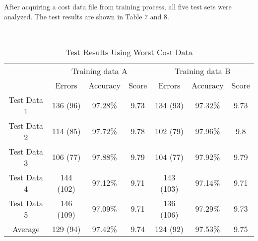 \documentclass[english]{nlp}
\begin{document}
After acquiring a cost data file from training process, all five test
sets were analyzed. The test results are shown in Table 7 and 8.

\begin{table}[ht]
\begin{center}
\caption{Test Results Using Worst Cost Data}
~\\\vspace{-2mm}
\label{table:test_resultsA}
\begin{tabular}{|c|c|c|c|c|c|c|}
\cline{2-7}
\multicolumn{1}{c}{~} & \multicolumn{3}{|c|}{Training data A} & \multicolumn{3}{|c|}{Training data B} \\
\cline{2-7}
\cline{2-7}
\multicolumn{1}{c|}{~} & Errors & Accuracy & Score & Errors & Accuracy & Score\\
\hline
\hline
Test Data 1 & 136 (96) & 97.28\% & 9.73 & 134 (93) & 97.32\% & 9.73\\
\hline
Test Data 2 & 114 (85) & 97.72\% & 9.78 & 102 (79) & 97.96\% & 9.8\\
\hline
Test Data 3 & 106 (77) & 97.88\% & 9.79 & 104 (77) & 97.92\% & 9.79\\
\hline
Test Data 4 & 144 (102) & 97.12\% & 9.71 & 143 (103) & 97.14\% & 9.71\\
\hline
Test Data 5 & 146 (109) & 97.09\% & 9.71 & 136 (106) & 97.29\% & 9.73\\
\hline
\hline
Average & 129 (94) & 97.42\% & 9.74 & 124 (92) & 97.53\% & 9.75\\
\hline
\end{tabular}
\end{center}
\end{table}
\end{document}
